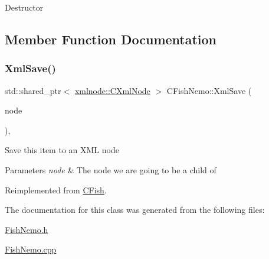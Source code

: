 Destructor 

\subsection{Member Function Documentation}
\mbox{\label{class_c_fish_nemo_ae9fd9446cd4852c9d9a78831bec0f32f}} 
\subsubsection{\texorpdfstring{Xml\+Save()}{XmlSave()}}
{\footnotesize\ttfamily std\+::shared\+\_\+ptr$<$ \mbox{\hyperlink{classxmlnode_1_1_c_xml_node}{xmlnode\+::\+C\+Xml\+Node}} $>$ C\+Fish\+Nemo\+::\+Xml\+Save (\begin{DoxyParamCaption}\item[{const std\+::shared\+\_\+ptr$<$ \mbox{\hyperlink{classxmlnode_1_1_c_xml_node}{xmlnode\+::\+C\+Xml\+Node}} $>$ \&}]{node }\end{DoxyParamCaption})\hspace{0.3cm}{\ttfamily [override]}, {\ttfamily [virtual]}}

Save this item to an X\+ML node 
\begin{DoxyParams}{Parameters}
{\em node} & The node we are going to be a child of \\
\hline
\end{DoxyParams}


Reimplemented from \mbox{\hyperlink{class_c_fish_abfc997d2d755be8f94069c57e75a854b}{C\+Fish}}.



The documentation for this class was generated from the following files\+:\begin{DoxyCompactItemize}
\item 
\mbox{\hyperlink{_fish_nemo_8h}{Fish\+Nemo.\+h}}\item 
\mbox{\hyperlink{_fish_nemo_8cpp}{Fish\+Nemo.\+cpp}}\end{DoxyCompactItemize}
